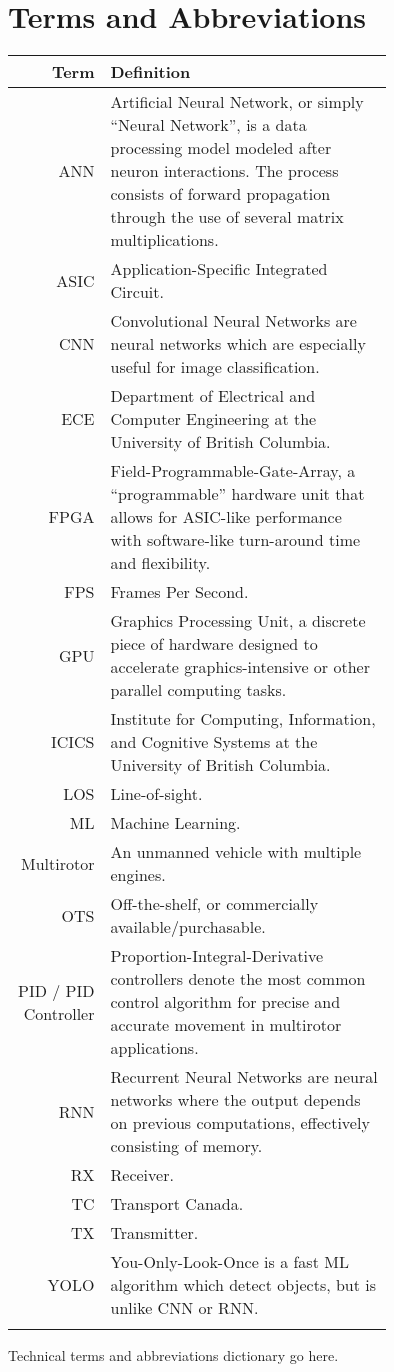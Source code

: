 \thispagestyle{empty}

\section*{Terms and Abbreviations}

\begin{tabular}[h]{rp{0.75\linewidth}}
    \hline
    \textbf{Term} & \textbf{Definition}\\
    \hline

    ANN & Artificial Neural Network, or simply ``Neural Network'', is a data processing model modeled after neuron interactions. The process consists of forward propagation through the use of several matrix multiplications.\cite{ann}\\
    ASIC & Application-Specific Integrated Circuit.\\
    CNN & Convolutional Neural Networks are neural networks which are especially useful for image classification.\cite{cnn} \\
    ECE & Department of Electrical and Computer Engineering at the University of British Columbia.\\
    FPGA & Field-Programmable-Gate-Array, a ``programmable'' hardware unit that allows for ASIC-like performance with software-like turn-around time and flexibility.\\
    FPS & Frames Per Second.\\
    GPU & Graphics Processing Unit, a discrete piece of hardware designed to accelerate graphics-intensive or other parallel computing tasks.\\
	ICICS & Institute for Computing, Information, and Cognitive Systems at the University of British Columbia.\\
    LOS & Line-of-sight.\\
    ML & Machine Learning.\\
    Multirotor & An unmanned vehicle with multiple engines. \\
    OTS & Off-the-shelf, or commercially available/purchasable. \\
    PID / PID Controller & Proportion-Integral-Derivative controllers denote the most common control algorithm for precise and accurate movement in multirotor applications.\cite{pid}\\
    RNN & Recurrent Neural Networks are neural networks where the output depends on previous computations, effectively consisting of memory.\cite{rnn}\\
    RX & Receiver.\\
    TC & Transport Canada.\\
    TX & Transmitter.\\
    YOLO & You-Only-Look-Once is a fast ML algorithm which detect objects, but is unlike CNN or RNN.\cite{yolo}\cite{yolo-2}\\
     & \\

    \hline

\end{tabular}

Technical terms and abbreviations dictionary go here.
